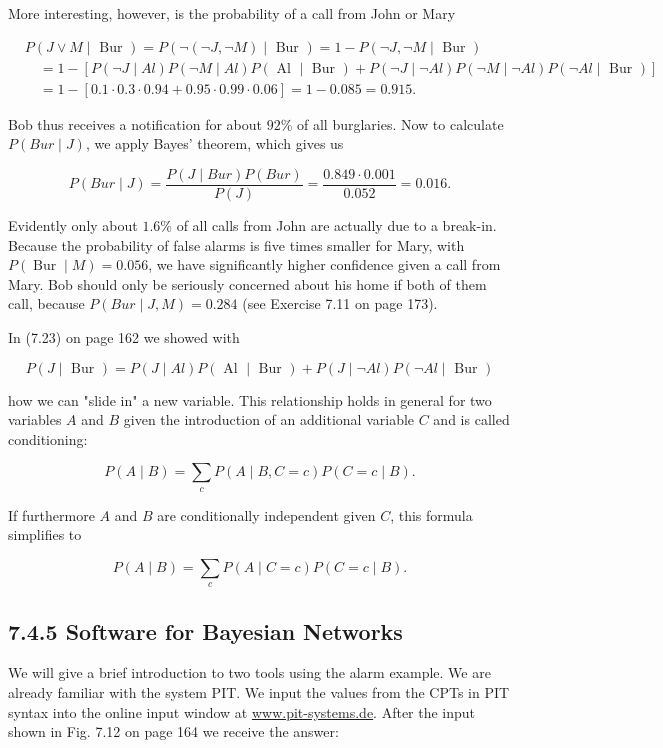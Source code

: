 \documentclass[10pt]{article}
\begin{document}
More interesting, however, is the probability of a call from John or Mary

$$
\begin{aligned}
& P(J \vee M \mid \text { Bur })=P(\neg(\neg J, \neg M) \mid \text { Bur })=1-P(\neg J, \neg M \mid \text { Bur }) \\
& \quad=1-[P(\neg J \mid A l) P(\neg M \mid A l) P(\text { Al } \mid \text { Bur })+P(\neg J \mid \neg A l) P(\neg M \mid \neg A l) P(\neg A l \mid \text { Bur })] \\
& \quad=1-[0.1 \cdot 0.3 \cdot 0.94+0.95 \cdot 0.99 \cdot 0.06]=1-0.085=0.915 .
\end{aligned}
$$

Bob thus receives a notification for about $92 \%$ of all burglaries. Now to calculate $P(B u r \mid J)$, we apply Bayes' theorem, which gives us

$$
P(B u r \mid J)=\frac{P(J \mid B u r) P(B u r)}{P(J)}=\frac{0.849 \cdot 0.001}{0.052}=0.016 .
$$

Evidently only about $1.6 \%$ of all calls from John are actually due to a break-in. Because the probability of false alarms is five times smaller for Mary, with $P(\operatorname{Bur} \mid M)=0.056$, we have significantly higher confidence given a call from Mary. Bob should only be seriously concerned about his home if both of them call, because $P(B u r \mid J, M)=0.284$ (see Exercise 7.11 on page 173).

In (7.23) on page 162 we showed with

$$
P(J \mid \text { Bur })=P(J \mid A l) P(\text { Al } \mid \text { Bur })+P(J \mid \neg A l) P(\neg A l \mid \text { Bur })
$$

how we can "slide in" a new variable. This relationship holds in general for two variables $A$ and $B$ given the introduction of an additional variable $C$ and is called conditioning:

$$
P(A \mid B)=\sum_{c} P(A \mid B, C=c) P(C=c \mid B) .
$$

If furthermore $A$ and $B$ are conditionally independent given $C$, this formula simplifies to

$$
P(A \mid B)=\sum_{c} P(A \mid C=c) P(C=c \mid B) .
$$

\subsection*{7.4.5 Software for Bayesian Networks}
We will give a brief introduction to two tools using the alarm example. We are already familiar with the system PIT. We input the values from the CPTs in PIT syntax into the online input window at \href{http://www.pit-systems.de}{www.pit-systems.de}. After the input shown in Fig. 7.12 on page 164 we receive the answer:
\end{document}
